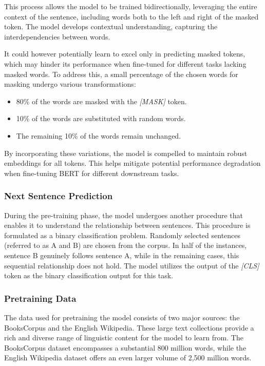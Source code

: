 \documentclass[12pt,oneside,bibtotoc,liststotoc]{scrbook}
\begin{document}
This process allows the model to be trained bidirectionally, leveraging the entire context of the sentence, including words both to the left and right of the masked token. The model develops contextual understanding, capturing the interdependencies between words.

It could however potentially learn to excel only in predicting masked tokens, which may hinder its performance when fine-tuned for different tasks lacking masked words. To address this, a small percentage of the chosen words for masking undergo various transformations:

\begin{itemize}
  \item 80\% of the words are masked with the \textit{[MASK]} token.
  \item 10\% of the words are substituted with random words.
  \item The remaining 10\% of the words remain unchanged.
\end{itemize}

By incorporating these variations, the model is compelled to maintain robust embeddings for all tokens. This helps mitigate potential performance degradation when fine-tuning BERT for different downstream tasks. \cite{bert}

\subsubsection{Next Sentence Prediction}
During the pre-training phase, the model undergoes another procedure that enables it to understand the relationship between sentences. This procedure is formulated as a binary classification problem. Randomly selected sentences (referred to as A and B) are chosen from the corpus. In half of the instances, sentence B genuinely follows sentence A, while in the remaining cases, this sequential relationship does not hold. The model utilizes the output of the \textit{[CLS]} token as the binary classification output for this task. \cite{bert}

\subsubsection{Pretraining Data}
The data used for pretraining the model consists of two major sources: the BooksCorpus and the English Wikipedia. These large text collections provide a rich and diverse range of linguistic content for the model to learn from. The BooksCorpus dataset encompasses a substantial 800 million words, while the English Wikipedia dataset offers an even larger volume of 2,500 million words.
\end{document}

